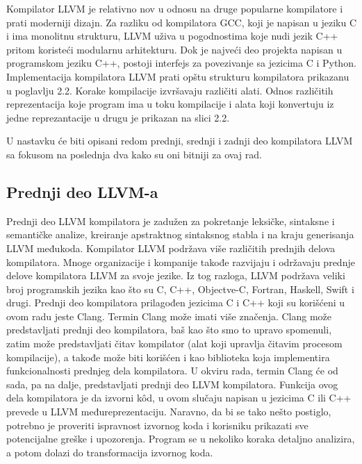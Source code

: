 \documentclass[12pt,oneside]{memoir}
\begin{document}
Kompilator LLVM je relativno nov u odnosu na druge popularne kompilatore
i prati moderniji dizajn. Za razliku od kompilatora GCC, koji je napisan u
jeziku C i ima monolitnu strukturu, LLVM uživa u pogodnostima koje nudi jezik
C++ pritom koristeći modularnu arhitekturu. Dok je najveći deo projekta napisan u programskom jeziku C++, postoji interfejs za povezivanje sa jezicima C i Python.
Implementacija kompilatora LLVM prati opštu strukturu kompilatora prikazanu
u poglavlju 2.2. Korake kompilacije izvršavaju različiti alati. Odnos različitih
reprezentacija koje program ima u toku kompilacije i alata koji konvertuju iz jedne
reprezantacije u drugu je prikazan na slici 2.2. 
 
U nastavku će biti opisani redom prednji, srednji i zadnji deo kompilatora LLVM sa fokusom na poslednja dva kako su oni bitniji za ovaj rad.


\subsection{Prednji deo LLVM-a}
Prednji deo LLVM kompilatora je zadužen za pokretanje leksičke, sintaksne i semantičke analize, kreiranje apstraktnog sintaksnog stabla i na kraju generisanja LLVM međukoda.
Kompilator LLVM podržava više različitih prednjih delova kompilatora. Mnoge organizacije i kompanije takođe razvijaju i održavaju prednje delove kompilatora LLVM za svoje jezike. Iz tog razloga, LLVM podržava veliki broj programskih jezika kao što su C, C++, Objectve-C, Fortran, Haskell, Swift i drugi. Prednji deo kompilatora prilagođen jezicima C i C++ koji su korišćeni u ovom radu jeste Clang. Termin Clang može imati više značenja. Clang može predstavljati prednji deo kompilatora, baš kao što smo to upravo spomenuli, zatim može predstavljati čitav kompilator (alat koji upravlja čitavim procesom kompilacije), a takođe može biti korišćen i kao biblioteka koja implementira funkcionalnosti prednjeg dela kompilatora. U okviru rada, termin Clang će od sada, pa na dalje, predstavljati prednji deo LLVM kompilatora.
Funkcija ovog dela kompilatora je da izvorni kôd, u ovom slučaju napisan u
jezicima C ili C++ prevede u LLVM međureprezentaciju. 
Naravno, da bi se tako nešto postiglo, potrebno je proveriti ispravnost izvornog koda i korisniku prikazati sve potencijalne greške i upozorenja. Program se u nekoliko koraka detaljno analizira, a potom dolazi do transformacija izvornog koda.
\end{document}
